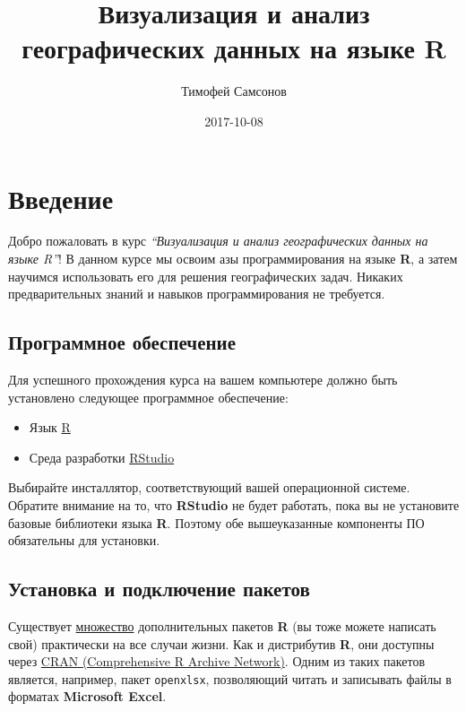 \documentclass[]{book}
\title{Визуализация и анализ географических данных на языке R}
\author{Тимофей Самсонов}
\date{2017-10-08}
\providecommand{\tightlist}{%
  \setlength{\itemsep}{0pt}\setlength{\parskip}{0pt}}
\begin{document}
\maketitle

{
\setcounter{tocdepth}{1}
\tableofcontents
}
\chapter*{Введение}

Добро пожаловать в курс \emph{``Визуализация и анализ географических
данных на языке R''}! В данном курсе мы освоим азы программирования на
языке \textbf{R}, а затем научимся использовать его для решения
географических задач. Никаких предварительных знаний и навыков
программирования не требуется.

\section*{Программное обеспечение}\label{-}

Для успешного прохождения курса на вашем компьютере должно быть
установлено следующее программное обеспечение:

\begin{itemize}
\tightlist
\item
  Язык \href{https://cran.r-project.org}{R}
\item
  Среда разработки
  \href{https://www.rstudio.com/products/rstudio/download3/}{RStudio}
\end{itemize}

Выбирайте инсталлятор, соответствующий вашей операционной системе.
Обратите внимание на то, что \textbf{RStudio} не будет работать, пока вы
не установите базовые библиотеки языка \textbf{R}. Поэтому обе
вышеуказанные компоненты ПО обязательны для установки.

\section*{Установка и подключение пакетов}\label{---}

Существует \href{https://cran.r-project.org/web/packages/}{множество}
дополнительных пакетов \textbf{R} (вы тоже можете написать свой)
практически на все случаи жизни. Как и дистрибутив \textbf{R}, они
доступны через \href{https://cran.r-project.org}{CRAN (Comprehensive R
Archive Network)}. Одним из таких пакетов является, например, пакет
\texttt{openxlsx}, позволяющий читать и записывать файлы в форматах
\textbf{Microsoft Excel}.
\end{document}
